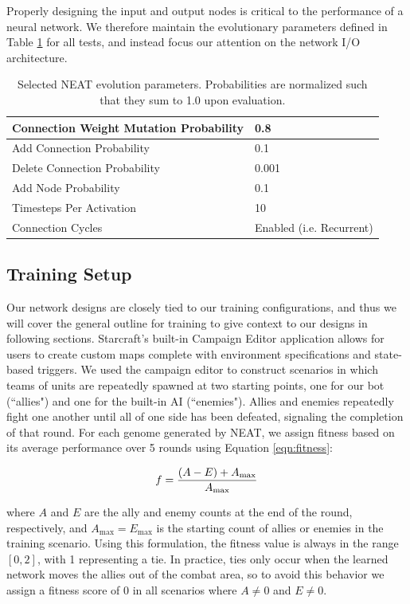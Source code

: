 \documentclass[a4paper]{article}
\begin{document}
Properly designing the input and output nodes is critical to the performance of a neural network. We therefore maintain the evolutionary parameters defined in Table \ref{tab:neat_params_specific} for all tests, and instead focus our attention on the network I/O architecture.

\begin{table}
\centering
\begin{tabular}{|l|l|}
	\hline
	Connection Weight Mutation Probability & 0.8\\ \hline
	Add Connection Probability & 0.1\\ \hline
	Delete Connection Probability & 0.001\\ \hline
	Add Node Probability & 0.1\\ \hline
	Timesteps Per Activation & 10\\ \hline
	Connection Cycles & Enabled (i.e. Recurrent)\\ \hline
\end{tabular}
\caption{Selected NEAT evolution parameters. Probabilities are normalized such that they sum to 1.0 upon evaluation.}
\label{tab:neat_params_specific}
\end{table}

\subsection{Training Setup}

Our network designs are closely tied to our training configurations, and thus we will cover the general outline for training to give context to our designs in following sections. Starcraft's built-in Campaign Editor application allows for users to create custom maps complete with environment specifications and state-based triggers. We used the campaign editor to construct scenarios in which teams of units are repeatedly spawned at two starting points, one for our bot (``allies") and one for the built-in AI (``enemies"). Allies and enemies repeatedly fight one another until all of one side has been defeated, signaling the completion of that round. For each genome generated by NEAT, we assign fitness based on its average performance over 5 rounds using Equation \ref{eqn:fitness}:

\begin{equation}
f = \frac{(A - E) + A_\mathrm{max}}{A_\mathrm{max}}\\
\label{eqn:fitness}
\end{equation}

where $A$ and $E$ are the ally and enemy counts at the end of the round, respectively, and $A_\mathrm{max} = E_\mathrm{max}$ is the starting count of allies or enemies in the training scenario. Using this formulation, the fitness value is always in the range $[0,2]$, with 1 representing a tie. In practice, ties only occur when the learned network moves the allies out of the combat area, so to avoid this behavior we assign a fitness score of 0 in all scenarios where $A \neq 0$ and $E \neq 0$.
\end{document}
